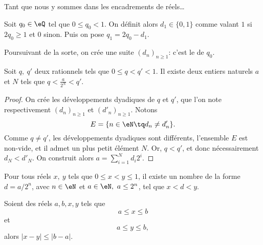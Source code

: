 Tant que nous y sommes dans les encadrements de réels\dots
\begin{normaltext}
  Soit \(q_0 \in \eQ \) tel que \( 0 \leq q_0 < 1 \). On définit alors \( d_1 \in \{0, 1\} \) comme valant \( 1 \) si \( 2 q_0 \geq 1 \) et \(0 \) sinon. Puis on pose \( q_1 = 2 q_0 - d_1 \).

  Poursuivant de la sorte, on crée une suite \( (d_n)_{n\geq 1} \): c'est le  de \( q_0 \).
\end{normaltext}

\begin{lemma}        \label{LEMooRSLIooVrZMxM}
  Soit \( q,\ q' \) deux rationnels tels que \( 0 \leq q < q' < 1 \). Il existe deux entiers naturels \( a \) et \( N \) tels que \( q < \frac a {2^N} < q' \).
\end{lemma}
\begin{proof}
  On crée les développements dyadiques de \( q \) et \( q' \), que l'on note respectivement \( (d_n)_{n\geq 1} \) et \( (d'_n)_{n\geq 1} \). Notons
  \begin{equation}
    E = \{ n \in \eN \tq d_n \neq d'_n \}.
  \end{equation}
Comme \( q \neq q' \), les développements dyadiques sont différents, l'ensemble \(E\) est non-vide, et il admet un plus petit élément \(N \). Or, \( q < q' \), et donc nécessairement \( d_N < d'_N \). On construit alors \( a = \sum_{i=1}^{N} d_i 2^i \). 
\end{proof}

\begin{corollary}\label{CorDensiteDyadiques}
  Pour tous réels \(x,\ y\) tels que \( 0 \leq x < y \leq 1 \), il existe un nombre de la forme \( d = a / 2^n \), avec \( n \in \eN \) et \( a \in \eN,\ a \leq 2^n\), tel que \( x < d < y \).
\end{corollary}


\begin{lemma}        \label{LEMooEGYLooCGrDrl}
    Soient des réels \( a,b,x,y\) tels que
    \begin{equation}
        a\leq x\leq b
    \end{equation}
    et
    \begin{equation}
        a\leq y\leq b,
    \end{equation}
    alors \( | x-y |\leq | b-a |\).
\end{lemma}


